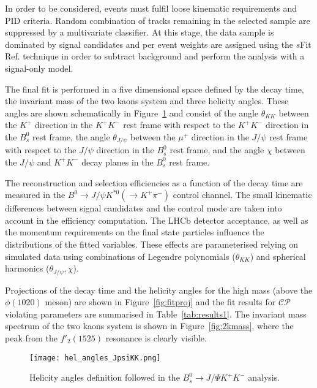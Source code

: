 \documentclass[12pt]{article}
\begin{document}
In order to be considered, events must fulfil loose kinematic requirements and PID criteria. Random combination of tracks remaining in the selected sample are suppressed by a multivariate classifier. At this stage, the data sample is dominated by signal candidates and per event weights are assigned using the $s$Fit Ref. \cite{sfit} technique in order to subtract background and perform the analysis with a signal-only model. 

The final fit is performed in a five dimensional space defined by the decay time, the invariant mass of the two kaons system and three helicity angles. These angles are shown schematically in Figure~\ref{fig:angles} and consist of the angle $\theta_{KK}$ between the $K^+$ direction in the $K^+K^-$ rest frame with respect to the $K^+K^-$ direction in the $B^0_s$ rest frame, the angle $\theta_{J/\psi}$ between the $\mu^+$ direction in the $J/\psi$ rest frame with respect to the $J/\psi$ direction in the $B^0_s$ rest frame, and the angle $\chi$ between the $J/\psi$ and $K^+K^-$ decay planes in the $B^0_s$ rest frame. 

The reconstruction and selection efficiencies as a function of the decay time are measured in the $B^0\rightarrow J/\psi K^{*0}(\rightarrow K^+\pi^-)$ control channel. The small kinematic differences between signal candidates and the control mode are taken into account in the efficiency computation. The LHCb detector acceptance, as well as the momentum requirements on the final state particles influence the distributions of the fitted variables. These effects are parameterised relying on simulated data using combinations of Legendre polynomials ($\theta_{KK}$) and spherical harmonics ($\theta_{J/\psi}, \chi$).

Projections of the decay time and the helicity angles for the high mass (above the $\phi(1020)$ meson) are shown in Figure~\ref{fig:fitproj} and the fit results for $\mathcal{CP}$ violating parameters are summarised in Table~\ref{tab:results1}. The invariant mass spectrum of the two kaons system is shown in Figure~\ref{fig:2kmass}, where the peak from the $f'_2(1525)$ resonance is clearly visible. 

\begin{figure}[htb]
\begin{center}
\texttt{[image: hel\_angles\_JpsiKK.png]}
\caption{Helicity angles definition followed in the $B^0_s\rightarrow J/\Psi K^+K^-$ analysis.}
\label{fig:angles}
\end{center}
\end{figure}
\end{document}

